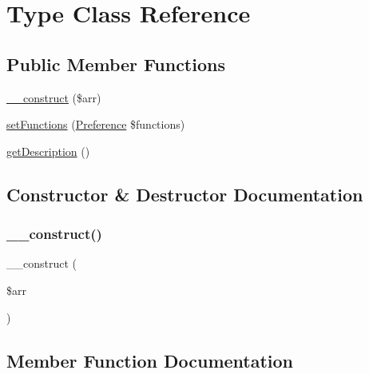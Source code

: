 \hypertarget{class_classes_1_1_types_1_1_type}{}\section{Type Class Reference}
\label{class_classes_1_1_types_1_1_type}
\subsection*{Public Member Functions}
\begin{DoxyCompactItemize}
\item 
\hyperlink{class_classes_1_1_types_1_1_type_a486200d625fce8d389146cafb948bb11}{\+\_\+\+\_\+construct} (\$arr)
\item 
\hyperlink{class_classes_1_1_types_1_1_type_a71d04ef07804d67e24e87339e00d8446}{set\+Functions} (\hyperlink{class_classes_1_1_preferences_1_1_preference}{Preference} \$functions)
\item 
\hyperlink{class_classes_1_1_types_1_1_type_a2e7bb35c71bf1824456ceb944cb7a845}{get\+Description} ()
\end{DoxyCompactItemize}


\subsection{Constructor \& Destructor Documentation}
\mbox{\label{class_classes_1_1_types_1_1_type_a486200d625fce8d389146cafb948bb11}} 
\subsubsection{\texorpdfstring{\+\_\+\+\_\+construct()}{\_\_construct()}}
{\footnotesize\ttfamily \+\_\+\+\_\+construct (\begin{DoxyParamCaption}\item[{}]{\$arr }\end{DoxyParamCaption})}



\subsection{Member Function Documentation}
\mbox{\label{class_classes_1_1_types_1_1_type_a2e7bb35c71bf1824456ceb944cb7a845}} 
